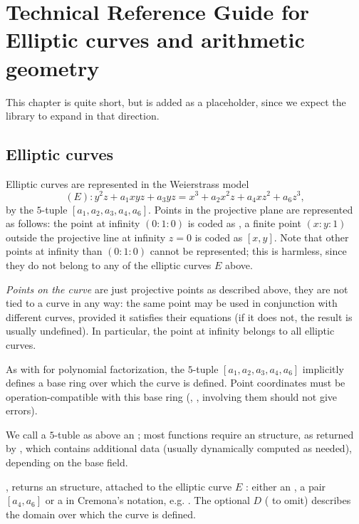 %
%
\chapter{Technical Reference Guide for Elliptic curves and arithmetic geometry}

This chapter is quite short, but is added as a placeholder, since
we expect the library to expand in that direction.

\section{Elliptic curves}
Elliptic curves are represented in the Weierstrass model
$$ (E): y^2z + a_1xyz + a_3 yz = x^3 + a_2 x^2z + a_4 xz^2 + a_6z^3, $$
by the $5$-tuple $[a_1,a_2,a_3,a_4,a_6]$. Points in the projective
plane are represented as follows: the point at infinity $(0:1:0)$ is coded
as \kbd{[0]}, a finite point $(x:y:1)$ outside the projective line at infinity
$z = 0$ is coded as $[x,y]$. Note that other points at infinity than $(0:1:0)$
cannot be represented; this is harmless, since they do not belong to any of
the elliptic curves $E$ above.

\emph{Points on the curve} are just projective points as described above,
they are not tied to a curve in any way: the same point may be used in
conjunction with different curves, provided it satisfies their equations (if
it does not, the result is usually undefined). In particular, the point at
infinity belongs to all elliptic curves.

As with  for polynomial factorization, the $5$-tuple
$[a_1,a_2,a_3,a_4,a_6]$ implicitly defines a base ring over which the curve
is defined. Point coordinates must be operation-compatible with this
base ring (, ,  involving them should not give
errors).


We call a $5$-tuble as above an ; most functions require an
 structure, as returned by , which contains additional
data (usually dynamically computed as needed), depending on the base field.

, returns an  structure,
attached to the elliptic curve $E$ : either an , a pair $[a_4,a_6]$
or a  in Cremona's notation, e.g. . The optional $D$
( to omit) describes the domain over which the curve is defined.

